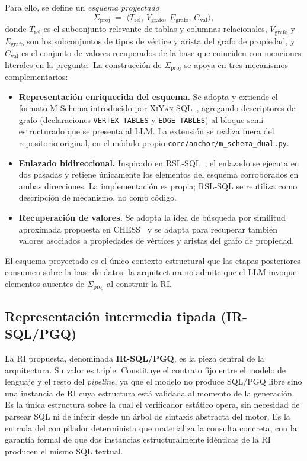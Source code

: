 Para ello, se define un \emph{esquema proyectado}
\[
\Sigma_{\mathrm{proj}} \;=\; \langle T_{\mathrm{rel}},\, V_{\mathrm{grafo}},\, E_{\mathrm{grafo}},\, C_{\mathrm{val}} \rangle,
\]
donde $T_{\mathrm{rel}}$ es el subconjunto relevante de tablas y columnas relacionales, $V_{\mathrm{grafo}}$ y $E_{\mathrm{grafo}}$ son los subconjuntos de tipos de vértice y arista del grafo de propiedad, y $C_{\mathrm{val}}$ es el conjunto de valores recuperados de la base que coinciden con menciones literales en la pregunta. La construcción de $\Sigma_{\mathrm{proj}}$ se apoya en tres mecanismos complementarios:

\begin{itemize}
    \item \textbf{Representación enriquecida del esquema.} Se adopta y extiende el formato M-Schema introducido por \textsc{XiYan-SQL}~\cite{XiYan-SQL2024}, agregando descriptores de grafo (declaraciones \texttt{VERTEX TABLES} y \texttt{EDGE TABLES}) al bloque semi-estructurado que se presenta al \ac{LLM}. La extensión se realiza fuera del repositorio original, en el módulo propio \texttt{core/anchor/m\_schema\_dual.py}.
    \item \textbf{Enlazado bidireccional.} Inspirado en \textsc{RSL-SQL}~\cite{RSL-SQL2024}, el enlazado se ejecuta en dos pasadas y retiene únicamente los elementos del esquema corroborados en ambas direcciones. La implementación es propia; RSL-SQL se reutiliza como descripción de mecanismo, no como código.
    \item \textbf{Recuperación de valores.} Se adopta la idea de búsqueda por similitud aproximada propuesta en \textsc{CHESS}~\cite{CHESS2024} y se adapta para recuperar también valores asociados a propiedades de vértices y aristas del grafo de propiedad.
\end{itemize}

El esquema proyectado es el único contexto estructural que las etapas posteriores consumen sobre la base de datos: la arquitectura no admite que el \ac{LLM} invoque elementos ausentes de $\Sigma_{\mathrm{proj}}$ al construir la \ac{RI}.

\subsection{Representación intermedia tipada (IR-SQL/PGQ)}
\label{subsec:prop-ri}

La \ac{RI} propuesta, denominada \textbf{IR-SQL/PGQ}, es la pieza central de la arquitectura. Su valor es triple. Constituye el contrato fijo entre el modelo de lenguaje y el resto del \emph{pipeline}, ya que el modelo no produce \ac{SQL}/\ac{PGQ} libre sino una instancia de \ac{RI} cuya estructura está validada al momento de la generación. Es la única estructura sobre la cual el verificador estático opera, sin necesidad de parsear \ac{SQL} ni de inferir desde un árbol de sintaxis abstracta del motor. Es la entrada del compilador determinista que materializa la consulta concreta, con la garantía formal de que dos instancias estructuralmente idénticas de la \ac{RI} producen el mismo \ac{SQL} textual. %

